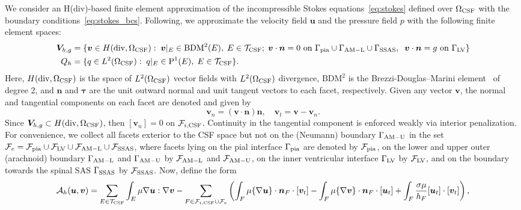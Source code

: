 We consider an H(div)-based finite element approximation of the incompressible Stokes equations~\eqref{eq:stokes} defined over $\Omega_{\rm CSF}$ with the boundary conditions~\eqref{eq:stokes_bcs}. Following\cite{hong2016robust}, we approximate the velocity field $\bm u$ and the pressure field $p$ with the following finite element spaces:
\begin{align*}
  \bm V_{h,g} &= \{ \bm v  \in H(\mathrm{div}, \Omega_{\mathrm{CSF}}): \;
  \bm v \vert_{E} \in \mathrm{BDM}^2(E), \; E \in \mathcal{T}_{\rm CSF}; \;
  \bm v \cdot \bm n = 0
  \text{ on } \Gamma_{\rm{pia}} \cup \Gamma_{\rm AM-L} \cup \Gamma_{\rm{SSAS}}, \;\; \bm v \cdot \bm n =  g %
  \text{ on } \Gamma_{\mathrm{LV}} \}  \\ 
  Q_h  &= \{q \in L^2(\Omega_{\rm CSF}): \; q \vert_E \in \mathrm{P}^1(E),
  \; E \in \mathcal{T}_{\rm CSF} \}. 
\end{align*}
Here, $H(\mathrm{div}, \Omega_{\rm{CSF}})$ is the space of $L^2(\Omega_{\rm{CSF}})$ vector fields with $L^2(\Omega_{\rm{CSF}})$ divergence, $\mathrm{BDM}^2$ is the Brezzi-Douglas--Marini element~\cite{brezzi1987mixed} of degree 2, and $\bm n$ and $\bm \tau$ are the unit outward normal and unit tangent vectors to each facet, respectively. Given any vector $\bm v$, the normal and tangential components on each facet are denoted and given by 
\begin{equation}
\bm v_n = (\bm v \cdot \bm n) \bm n, \quad \bm v_t = \bm v - \bm v_n. 
\end{equation}
Since $\bm V_{h,g} \subset H(\mathrm{div}, \Omega_{\rm CSF})$, then $[\bm
  v_n] = 0 $ on $\mathcal{F}_{i, \rm CSF}$. Continuity in the
tangential component is enforced weakly via interior penalization. For
convenience, we collect all facets exterior to the CSF space but not
on the (Neumann) boundary $\Gamma_{\rm AM-U}$ in the set
$\mathcal{F}_{e} = \mathcal{F}_{\rm pia} \cup \mathcal{F}_{\rm LV}
\cup \mathcal{F}_{\rm AM-L} \cup \mathcal{F}_{\rm SSAS}$, where facets
lying on the pial interface $\Gamma_{\rm pia}$ are denoted by
$\mathcal{F}_{\rm pia}$, on the lower and upper outer (arachnoid) boundary
$\Gamma_{\rm AM-L}$ and $\Gamma_{\rm AM-U}$ by $\mathcal{F}_{\rm AM-L}$ and $\mathcal{F}_{\rm AM-U}$, on the inner ventricular
interface $\Gamma_{\rm LV}$ by $\mathcal{F}_{\rm LV}$,
and on the boundary towards the spinal SAS $\Gamma_{\rm SSAS}$ by
$\mathcal{F}_{\rm SSAS}$. Now, define the form 
\begin{multline}
  \mathcal{A}_h(\bm u, \bm v)
  = \sum_{E \in \mathcal{T}_{\rm CSF}} \int_{E} \mu \nabla \bm u : \nabla \bm v
  - \sum_{F \in \mathcal{F}_{i, \rm CSF} \cup \mathcal{F}_{e}} \left (
  \int_{F} \mu \{\nabla \bm u\} \cdot \bm n_F \cdot [\bm v_t] 
  - %
  \int_{F} \mu \{\nabla \bm v\}\cdot \bm n_F \cdot [\bm u_t]
  + %
\int_{F}   \frac{\sigma \mu}{h_F} [\bm u_t ] \cdot [\bm v_t] \right ),   
\end{multline}
